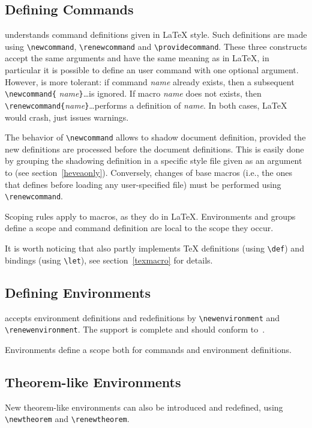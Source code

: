 \subsection{Defining Commands}\label{usermacro}

\hevea{} understands command definitions given in \LaTeX{} style. Such
definitions are made using
\verb+\newcommand+, \verb+\renewcommand+ and \verb+\providecommand+.
These three constructs accept the same arguments and have the same
meaning as in \LaTeX{}, in particular it is possible to define an user
command with one optional argument.
However, \hevea{} is more tolerant: if command
{\it name} already exists, then a subsequent \verb+\newcommand{+{\it
name}\verb+}+\ldots is ignored.  If macro {\it name} does not exists, then
\verb+\renewcommand{+{\it name}\verb+}+\ldots performs{} a definition of {\it
name}.  In both cases, \LaTeX{} would crash, \hevea{} just issues
warnings.

The behavior of \verb+\newcommand+ allows to shadow document
definition, provided the new definitions are processed before the
document definitions.
This is easily done by grouping the shadowing definition  in a
specific style file given as an argument to \hevea{} (see section~\ref{heveaonly}).
Conversely, changes of base macros (i.e., the ones that \hevea{}
defines before loading any user-specified file) must be performed
using \verb+\renewcommand+.



Scoping rules apply to macros, as they do in \LaTeX{}.
Environments and groups define a scope and command definition
are local to the scope they occur.

It is worth noticing that \hevea{} also partly implements \TeX{} definitions
(using \verb+\def+) and bindings (using \verb+\let+), see
section~\ref{texmacro} for details.


\subsection{Defining Environments}
\hevea{} accepts environment definitions and redefinitions
by \verb+\newenvironment+ and \verb+\renewenvironment+.
The support is complete and should conform
to~\cite[Sections~C.8.2]{latex}.


Environments define a scope both for commands and environment
definitions.


\subsection{Theorem-like Environments}
New theorem-like environments can also be introduced and redefined,
using \verb+\newtheorem+ and \verb+\renewtheorem+.

